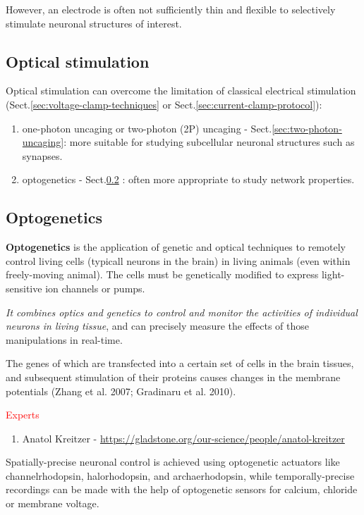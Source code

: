However, an electrode is often not sufficiently thin and flexible to selectively
stimulate neuronal structures of interest.

\subsection{Optical stimulation}

Optical stimulation can overcome the limitation of classical electrical
stimulation (Sect.\ref{sec:voltage-clamp-techniques} or
Sect.\ref{sec:current-clamp-protocol}):

\begin{enumerate}

  \item one-photon uncaging or two-photon (2P) uncaging -
  Sect.\ref{sec:two-photon-uncaging}: more suitable for studying subcellular
  neuronal structures such as synapses.

  \item optogenetics - Sect.\ref{sec:optogenetics} : often more appropriate to
  study network properties.
\end{enumerate}


\subsection{Optogenetics}
\label{sec:optogenetics}

{\bf Optogenetics} is the application of genetic and optical techniques to
remotely control living cells (typicall neurons in the brain) in living animals
(even within freely-moving animal).
The cells must be genetically modified to express light-sensitive ion channels
or pumps.

{\it It combines optics and genetics to control and monitor the activities of
individual neurons in living tissue}, and can precisely measure the effects of
those manipulations in real-time.

The genes of which are transfected into a certain set of cells in the brain
tissues, and subsequent stimulation of their proteins causes changes in the
membrane potentials (Zhang et al. 2007; Gradinaru et al. 2010).

\textcolor{red}{Experts}
\begin{enumerate}
  \item Anatol Kreitzer -
  \url{https://gladstone.org/our-science/people/anatol-kreitzer}
\end{enumerate}

Spatially-precise neuronal control is achieved using optogenetic actuators like
channelrhodopsin, halorhodopsin, and archaerhodopsin, while temporally-precise
recordings can be made with the help of optogenetic sensors for calcium,
chloride or membrane voltage.


